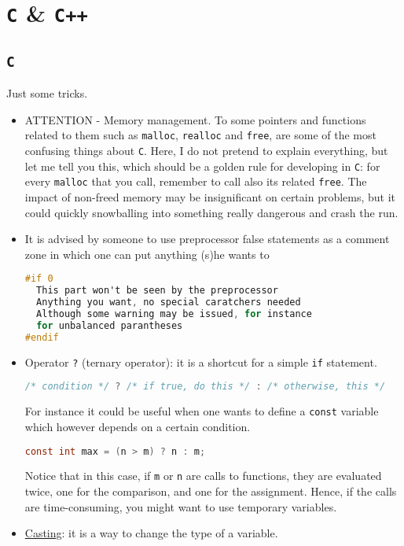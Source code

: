 \documentclass[a4paper,12pt,%
              final%
              ]{article}
\begin{document}
\section{\texttt{C} \& \texttt{C++}}
\label{sec:c}
\subsection{\texttt{C}}
Just some tricks.
\begin{itemize}
  \item ATTENTION - Memory management. To some pointers and functions related to them such as \texttt{malloc}, \texttt{realloc} and \texttt{free}, are some of the most confusing things about \texttt{C}. Here, I do not pretend to explain everything, but let me tell you this, which should be a golden rule for developing in \texttt{C}: for every \texttt{malloc} that you call, remember to call also its related \texttt{free}. The impact of non-freed memory may be insignificant on certain problems, but it could quickly snowballing into something really dangerous and crash the run.
  \item It is advised by someone to use preprocessor false statements as a comment zone in which one can put anything (s)he wants to
\begin{lstlisting}[language=C]
#if 0
  This part won't be seen by the preprocessor
  Anything you want, no special caratchers needed
  Although some warning may be issued, for instance
  for unbalanced parantheses
#endif
\end{lstlisting}
  \item Operator \verb|?| (ternary operator): it is a shortcut for a simple \texttt{if} statement.
\begin{lstlisting}[language=C]
/* condition */ ? /* if true, do this */ : /* otherwise, this */
\end{lstlisting}
    For instance it could be useful when one wants to define a \texttt{const} variable which however depends on a certain condition.
\begin{lstlisting}[language=C]
  const int max = (n > m) ? n : m;
\end{lstlisting}
    Notice that in this case, if \verb|m| or \verb|n| are calls to functions, they are evaluated twice, one for the comparison, and one for the assignment. Hence, if the calls are time-consuming, you might want to use temporary variables.
  \item \href{https://www.improgrammer.net/type-casting-c-language/}{Casting}: it is a way to change the type of a variable.

\end{itemize}
\end{document}
